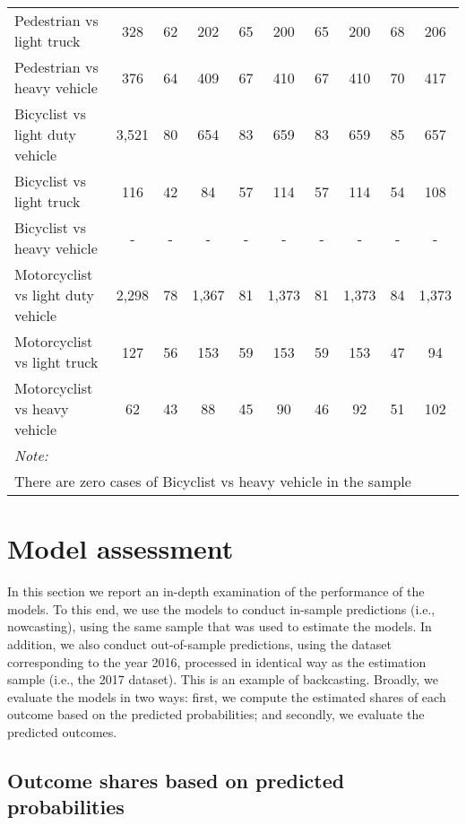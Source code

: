 \documentclass[]{elsarticle} %
\begin{document}
\begin{landscape}
\begin{table}
{\begin{tabular}[t]{lccccccccc}
\addlinespace
\rowcolor{gray!6}  Pedestrian vs light truck & 328 & 62 & 202 & 65 & 200 & 65 & 200 & 68 & 206\\
Pedestrian vs heavy vehicle & 376 & 64 & 409 & 67 & 410 & 67 & 410 & 70 & 417\\
\rowcolor{gray!6}  Bicyclist vs light duty vehicle & 3,521 & 80 & 654 & 83 & 659 & 83 & 659 & 85 & 657\\
Bicyclist vs light truck & 116 & 42 & 84 & 57 & 114 & 57 & 114 & 54 & 108\\
\rowcolor{gray!6}  Bicyclist vs heavy vehicle & - & - & - & - & - & - & - & - & -\\
\addlinespace
Motorcyclist vs light duty vehicle & 2,298 & 78 & 1,367 & 81 & 1,373 & 81 & 1,373 & 84 & 1,373\\
\rowcolor{gray!6}  Motorcyclist vs light truck & 127 & 56 & 153 & 59 & 153 & 59 & 153 & 47 & 94\\
Motorcyclist vs heavy vehicle & 62 & 43 & 88 & 45 & 90 & 46 & 92 & 51 & 102\\
\bottomrule
\multicolumn{10}{l}{\textit{Note: }}\\
\multicolumn{10}{l}{There are zero cases of Bicyclist vs heavy vehicle in the sample}\\
\end{tabular}}
\end{table}
\end{landscape}

\hypertarget{sec:assessment}{%
\section{Model assessment}\label{sec:assessment}}

In this section we report an in-depth examination of the performance of
the models. To this end, we use the models to conduct in-sample
predictions (i.e., nowcasting), using the same sample that was used to
estimate the models. In addition, we also conduct out-of-sample
predictions, using the dataset corresponding to the year 2016, processed
in identical way as the estimation sample (i.e., the 2017 dataset). This
is an example of backcasting. Broadly, we evaluate the models in two
ways: first, we compute the estimated shares of each outcome based on
the predicted probabilities; and secondly, we evaluate the predicted
outcomes.

\hypertarget{outcome-shares-based-on-predicted-probabilities}{%
\subsection{Outcome shares based on predicted
probabilities}\label{outcome-shares-based-on-predicted-probabilities}}
\end{document}

